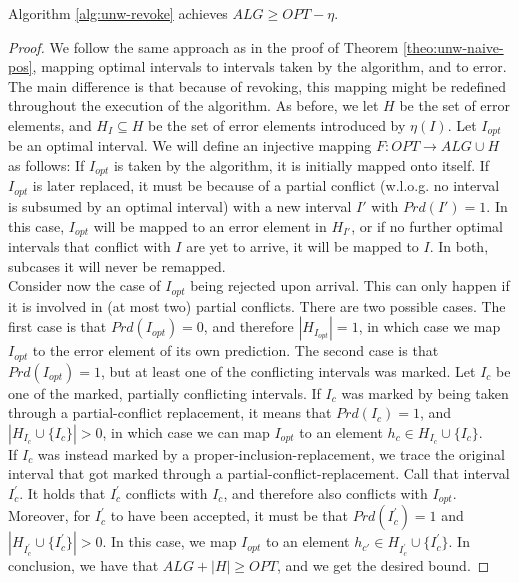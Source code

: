 \begin{theorem}
    Algorithm \ref{alg:unw-revoke} achieves $ALG \geq OPT - \eta$.
\end{theorem}
\begin{proof}
    We follow the same approach as in the proof of Theorem \ref{theo:unw-naive-pos}, mapping optimal intervals to intervals taken by the algorithm, and to error. The main difference is that because of revoking, this mapping might be redefined throughout the execution of the algorithm. As before, we let $H$ be the set of error elements, and $H_{I} \subseteq H$ be the set of error elements introduced by $\eta(I)$. Let $I_{opt}$ be an optimal interval. We will define an injective mapping $F: OPT \rightarrow ALG \cup H$ as follows: If $I_{opt}$ is taken by the algorithm, it is initially mapped onto itself. If $I_{opt}$ is later replaced, it must be because of a partial conflict (w.l.o.g. no interval is subsumed by an optimal interval) with a new interval $I'$ with $Prd(I') = 1$. In this case, $I_{opt}$ will be mapped to an error element in $H_{I'}$, or if no further optimal intervals that conflict with $I$ are yet to arrive, it will be mapped to $I$. In both, subcases it will never be remapped.\\
    Consider now the case of $I_{opt}$ being rejected upon arrival. This can only happen if it is involved in (at most two) partial conflicts. There are two possible cases. The first case is that $Prd(I_{opt}) = 0$, and therefore $|H_{I_{opt}}| = 1$, in which case we map $I_{opt}$ to the error element of its own prediction. The second case is that $Prd(I_{opt}) = 1$, but at least one of the conflicting intervals was marked. Let $I_{c}$ be one of the marked, partially conflicting intervals. If $I_{c}$ was marked by being taken through a partial-conflict replacement, it means that $Prd(I_{c}) = 1$, and $|H_{I_{c}} \cup \{I_c\}| > 0$, in which case we can map $I_{opt}$ to an element $h_{c} \in H_{I_{c}}\cup \{I_c\}$.\\
    If $I_{c}$ was instead marked by a proper-inclusion-replacement, we trace the original interval that got marked through a partial-conflict-replacement. Call that interval $I^{'}_{c}$. It holds that $I^{'}_{c}$ conflicts with $I_{c}$, and therefore also conflicts with $I_{opt}$. Moreover, for $I^{'}_{c}$ to have been accepted, it must be that $Prd(I^{'}_{c})=1$ and $|H_{I^{'}_{c}} \cup \{I^{'}_{c}\}|>0$. In this case, we map $I_{opt}$ to an element $h_{c'} \in H_{I^{'}_{c}} \cup \{I^{'}_{c}\}$. In conclusion, we have that $ALG + |H| \geq OPT$, and we get the desired bound.
\end{proof}

